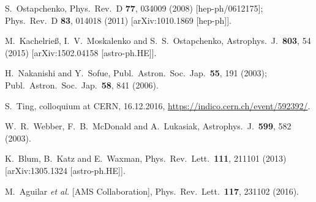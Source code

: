 \documentclass[prd,aps,twocolumn]{revtex4}
\begin{document}
\begin{thebibliography}{99}

S.~Ostapchenko,
  Phys.\ Rev.\ D {\bf 77}, 034009 (2008)
  [hep-ph/0612175];
  Phys.\ Rev.\ D {\bf 83}, 014018 (2011)
  [arXiv:1010.1869 [hep-ph]].

  M.~Kachelrie\ss, I.~V.~Moskalenko and S.~S.~Ostapchenko,
  Astrophys.\ J.\  {\bf 803},  54 (2015)
  [arXiv:1502.04158 [astro-ph.HE]].

  
  H.~Nakanishi and Y.~Sofue,
  Publ.\ Astron.\ Soc.\ Jap.\  {\bf 55}, 191 (2003);
  Publ.\ Astron.\ Soc.\ Jap.\  {\bf 58}, 841 (2006).



  
S.~Ting, colloquium at CERN, 16.12.2016,
\url{https://indico.cern.ch/event/592392/}.



  W.~R.~Webber, F.~B.~McDonald and A.~Lukasiak,
  Astrophys.\ J.\  {\bf 599}, 582 (2003).


  K.~Blum, B.~Katz and E.~Waxman,
  Phys.\ Rev.\ Lett.\  {\bf 111}, 211101 (2013)
  [arXiv:1305.1324 [astro-ph.HE]].


  M.~Aguilar {\it et al.} [AMS Collaboration],
  Phys.\ Rev.\ Lett.\  {\bf 117}, 231102 (2016).



\end{thebibliography}
\end{document}
